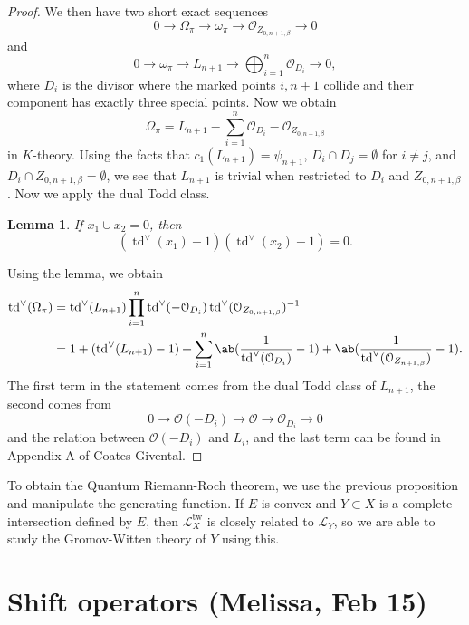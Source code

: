 \documentclass[leqno, openany]{memoir}
\newtheorem{lem}[thm]{Lemma}
\theoremstyle{definition}
\theoremstyle{remark}
\theoremstyle{plain}
\theoremstyle{definition}
\theoremstyle{remark}
\newcommand{\mc}[1]{\mathcal{#1}}
\newcommand{\mr}[1]{\mathrm{#1}}
\newcommand{\on}[1]{\operatorname{#1}}
\begin{document}
\begin{proof}
    We then have two short exact sequences
    \[ 0 \to \Omega_{\pi} \to \omega_{\pi} \to \mc{O}_{Z_{0,n+1,\beta}} \to 0 \]
    and
    \[ 0 \to \omega_{\pi} \to L_{n+1} \to \bigoplus_{i=1}^n \mc{O}_{D_i} \to 0, \]
    where $D_i$ is the divisor where the marked points $i, n+1$ collide and their component has exactly three special points. Now we obtain
    \[ \Omega_{\pi} = L_{n+1} - \sum_{i=1}^n \mc{O}_{D_i} - \mc{O}_{Z_{0,n+1,\beta}} \]
    in $K$-theory. Using the facts that $c_1(L_{n+1}) = \psi_{n+1}$, $D_i \cap D_j = \emptyset$ for $i \neq j$, and $D_i \cap Z_{0,n+1,\beta} = \emptyset$, we see that $L_{n+1}$ is trivial when restricted to $D_i$ and $Z_{0,n+1,\beta}$. Now we apply the dual Todd class.
    \begin{lem}
        If $x_1 \cup x_2 = 0$, then
        \[ (\on{td}^{\vee}(x_1)-1)(\on{td}^{\vee}(x_2)-1) = 0. \]
    \end{lem}
    Using the lemma, we obtain
    \begin{align*}
        \on{td}^{\vee}(\Omega_{\pi}) &= \on{td}^{\vee}(L_{n+1}) \prod_{i=1}^n \on{td}^{\vee}(-\mc{O}_{D_i}) \on{td}^{\vee}(\mc{O}_{Z_{0,n+1,\beta}})^{-1} \\
        &= 1 + (\on{td}^{\vee}(L_{n+1})-1) + \sum_{i=1}^n\ab(  \frac{1}{\on{td}^{\vee}(\mc{O}_{D_i})} -1 ) + \ab(\frac{1}{\on{td}^{\vee}(\mc{O}_{Z_{n+1,\beta}})}-1).
    \end{align*}
    The first term in the statement comes from the dual Todd class of $L_{n+1}$, the second comes from
    \[ 0 \to \mc{O}(-D_i) \to \mc{O} \to \mc{O}_{D_i} \to 0 \]
    and the relation between $\mc{O}(-D_i)$ and $L_i$, and the last term can be found in Appendix A of Coates-Givental.
\end{proof}

To obtain the Quantum Riemann-Roch theorem, we use the previous proposition and manipulate the generating function. If $E$ is convex and $Y \subset X$ is a complete intersection defined by $E$, then $\mc{L}_X^{\mr{tw}}$ is closely related to $\mc{L}_Y$, so we are able to study the Gromov-Witten theory of $Y$ using this.

\section{Shift operators (Melissa, Feb 15)}%
\label{sec:shift_operators}
\end{document}
